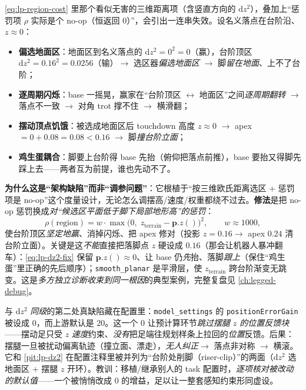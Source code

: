 \begin{pitfall}\label{pit:lp-dz2}
\cref{eq:lp-region-cost} 里那个看似无害的三维距离项（含竖直方向的 $\mathrm{d}z^2$），叠加上“惩罚项 $\rho$ 实际是个 no-op（恒返回 $0$）”，会引出一连串失效。设名义落点在台阶沿、$z\approx 0$：
\begin{itemize}
  \item \textbf{偏选地面区}：地面区到名义落点的 $\mathrm{d}z^2=0^2=0$（赢），台阶顶区 $\mathrm{d}z^2=0.16^2=0.0256$（输）$\to$ 选区器\emph{偏选地面区} $\to$ 脚\emph{留在地面}、上不了台阶；
  \item \textbf{逐周期闪烁}：base 一摇晃，赢家在“台阶顶区 $\leftrightarrow$ 地面区”之间\emph{逐周期翻转} $\to$ 落点不一致 $\to$ 对角 trot 撑不住 $\to$ 横滑翻；
  \item \textbf{摆动顶点饥饿}：被选成地面区后 touchdown 高度 $z\approx 0$ $\to$ apex $=0+0.08=0.08<0.16$ $\to$ 脚\emph{撞台阶立面}；
  \item \textbf{鸡生蛋耦合}：脚要上台阶得 base 先抬（俯仰把落点前推），base 要抬又得脚先踩上去——两者互为前提，谁也先动不了。
\end{itemize}
\textbf{为什么这是“架构缺陷”而非“调参问题”}：它根植于“按三维欧氏距离选区 + 惩罚项是 no-op”这个度量设计，无论怎么调摆高/速度/权重都绕不过去。\textbf{修法}是把 no-op 惩罚换成\emph{对“候选区平面低于脚下局部地形高”的惩罚}：
\begin{equation}
  \rho(\text{region}) = w\cdot \max\!\big(0,\; z_{\mathrm{terrain}}-\mathbf{p}.z()\big)^2,\qquad w\approx 1000,
  \label{eq:lp-dz2-fix}
\end{equation}
使台阶顶区\emph{坚定地赢}、消掉闪烁、把 apex 修对（投影 $z=0.16\to$ apex $0.24$ 清台阶立面）。关键是这\emph{不能}直接把落脚点 $z$ 硬设成 $0.16$（那会让机器人暴冲翻车）：\cref{eq:lp-dz2-fix} 保留 $\mathbf{p}.z()\approx 0$、让 base 仍\emph{先}抬、落脚\emph{跟上}（保住“鸡生蛋”里正确的先后顺序）；\texttt{smooth\_planar} 是平滑层，使 $z_{\mathrm{terrain}}$ 跨台阶渐变无跳变。这是\emph{多方独立诊断收束到同一根因}的典型案例，完整复盘见 \cref{ch:legged-debug}。
\end{pitfall}

\begin{pitfall}[摆腿 $z$ 位置反馈被关断：\texttt{positionErrorGain=0}]\label{pit:lp-posgain}
与 $\mathrm{d}z^2$ \emph{同级}的第二处真缺陷藏在配置里：\texttt{model\_settings} 的 \texttt{positionErrorGain} 被设成 $0$，而上游默认是 $20$。这一个 $0$ 让预计算环节\emph{跳过摆腿 $z$ 的位置反馈块}——摆动足只受 $z$ \emph{速度}约束、\emph{没有}把足端往规划样条上拉回的\emph{位置}反馈。后果：摆腿一旦被扰动偏离轨迹（撞立面、漂走），\emph{无人纠正}$\to$ 落点非对称 $\to$ 横滚。它和 \cref{pit:lp-dz2} 在配置注释里被并列为“台阶处削脚（riser-clip）”的两面（$\mathrm{d}z^2$ 选地面区 + 摆腿 $z$ 开环）。教训：移植/继承别人的 task 配置时，\emph{逐项核对被改动的默认值}——一个被悄悄改成 $0$ 的增益，足以让一整套感知约束形同虚设。
\end{pitfall}

